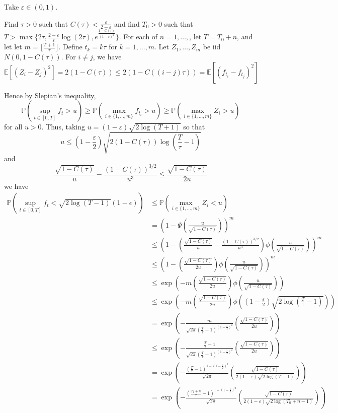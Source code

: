 \documentclass[11pt]{article}
\begin{document}
Take $\varepsilon \in (0,1)$.

Find $\tau > 0$ such that $C(\tau) <
\frac{\varepsilon}{2-\varepsilon}$ and find $T_0 > 0$ such that $T > \max\{ 2\tau,\frac{2-\varepsilon}{\varepsilon} \log(2\tau), e^{\frac{1-C(\tau)}{(1-\varepsilon)^2}}\}$.  For each of $n =
1,\hdots,$, let $T = T_0 + n$, and let let $m = \lfloor
\frac{T+1}{\tau} \rfloor$.  Define $t_k = k\tau$ for $k = 1,\hdots,m$.
Let $Z_1,\hdots, Z_m$ be iid $N(0,1-C(\tau))$.  For $i \neq j$, we have
\[
\mathbb{E}[(Z_i - Z_j)^2] = 2(1-C(\tau)) \leq 2(1-C((i-j)\tau)) = \mathbb{E}[(f_{t_i}-f_{t_j})^2]
\]

Hence by Slepian's inequality,
\[
\mathbb{P}(\sup_{t \in [0,T]} f_t > u) \geq
\mathbb{P}(\max_{i \in \{1,\hdots,m\}} f_{t_i} > u) \geq
\mathbb{P}(\max_{i \in \{1,\hdots,m\}} Z_i > u)\]
for all $u > 0$.
Thus, taking $u = (1-\varepsilon)\sqrt{2\log(T+1)}$
so that
\[
u \leq 
\left(1-\frac{\varepsilon}{2}\right) \sqrt{2(1-C(\tau)) \log\left(\frac{T}{\tau}-1\right)}
\]
and
\[
\frac{\sqrt{1-C(\tau)}}{u} - \frac{(1-C(\tau))^{3/2}}{u^3} \leq \frac{\sqrt{1-C(\tau)}}{2u}
\]
we have
\begin{align}
\mathbb{P}(\sup_{t \in [0,T]} f_t < \sqrt{2\log (T-1)}(1-\epsilon))
&\leq \mathbb{P}(\max_{i \in \{1,\hdots,m\}} Z_i < u)
\\&= \left(1-\Psi\left(\frac{u}{\sqrt{1-C(\tau)}}\right)\right)^m
\\&\leq \left(1-\left(\frac{\sqrt{1-C(\tau)}}{u} - \frac{(1-C(\tau))^{3/2}}{u^3}\right)\phi\left(\frac{u}{\sqrt{1-C(\tau)}}\right)\right)^m
\\&\leq \left(1-\left(\frac{\sqrt{1-C(\tau)}}{2u}\right)\phi\left(\frac{u}{\sqrt{1-C(\tau)}}\right)\right)^m
\\& \leq \exp\left(-m\left(\frac{\sqrt{1-C(\tau)}}{2u}\right)\phi\left(\frac{u}{\sqrt{1-C(\tau)}}\right)\right) 
\\& \leq \exp\left(-m\left(\frac{\sqrt{1-C(\tau)}}{2u}\right)\phi\left(\left(1-\frac{\varepsilon}{2}\right)\sqrt{2 \log\left(\frac{T}{\tau}-1\right)}\right)\right) 
\\& = \exp\left(-\frac{m}{\sqrt{2\pi}\left(\frac{T}{\tau}-1\right)^{(1-\frac{\varepsilon}{2})^2}}\left(\frac{\sqrt{1-C(\tau)}}{2u}\right)\right)
\\& \leq \exp\left(-\frac{\frac{T}{\tau}-1}{\sqrt{2\pi}\left(\frac{T}{\tau}-1\right)^{(1-\frac{\varepsilon}{2})^2}}\left(\frac{\sqrt{1-C(\tau)}}{2u}\right)\right)
\\& = \exp\left(-\frac{\left(\frac{T}{\tau}-1\right)^{1-(1-\frac{\varepsilon}{2})^2}}{\sqrt{2\pi}}\left(\frac{\sqrt{1-C(\tau)}}{2(1-\varepsilon)\sqrt{2\log(T-1)}}\right)\right)
\\& = \exp\left(-\frac{\left(\frac{T_0 + n}{\tau}-1\right)^{1-(1-\frac{\varepsilon}{2})^2}}{\sqrt{2\pi}}\left(\frac{\sqrt{1-C(\tau)}}{2(1-\varepsilon)\sqrt{2\log(T_0+n-1)}}\right)\right)
\end{align}
\end{document}
